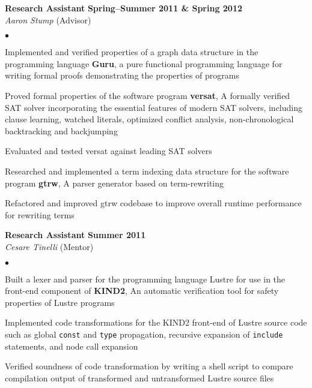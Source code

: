 \documentclass[10pt,letterpaper]{article}
\renewenvironment{itemize}{
  \begin{list}{}{
      \setlength{\leftmargin}{1.5em}
      \setlength{\itemsep}{0.25em}
      \setlength{\parskip}{0pt}
      \setlength{\parsep}{0.25em}
    }
  }{
  \end{list}
}
\newenvironment{bitemize}{
  \begin{list}{$\bullet$}{
      \setlength{\leftmargin}{1.5em}
      \setlength{\itemsep}{0.25em}
      \setlength{\parskip}{0pt}
      \setlength{\parsep}{0.25em}
    }
  }{
  \end{list}
}
\begin{document}
\begin{itemize}
\item \textbf{Research Assistant} \hfill \textbf{Spring--Summer 2011
    \& Spring 2012}\\
  \textit{Aaron Stump} (Advisor)
  \begin{bitemize}
  \item Implemented and verified properties of a graph data structure
    in the programming language \textbf{Guru}, a pure functional
    programming language for writing formal proofs demonstrating the
    properties of programs
  \item Proved formal properties of the software program
    \textbf{versat}, A formally verified SAT solver incorporating the
    essential features of modern SAT solvers, including clause
    learning, watched literals, optimized conflict analysis,
    non-chronological backtracking and backjumping
  \item Evaluated and tested versat against leading SAT solvers
  \item Researched and implemented a term indexing data structure for
    the software program \textbf{gtrw}, A parser generator based on
    term-rewriting
  \item Refactored and improved gtrw codebase to improve overall
    runtime performance for rewriting terms
  \end{bitemize}
\item \textbf{Research Assistant} \hfill \textbf{Summer 2011}\\
  \textit{Cesare Tinelli} (Mentor)
  \begin{bitemize}
  \item Built a lexer and parser for the programming language Lustre
    for use in the front-end component of \textbf{KIND2}, An automatic
    verification tool for safety properties of Lustre programs
  \item Implemented code transformations for the KIND2 front-end of
    Lustre source code such as global \texttt{const} and \texttt{type}
    propagation, recursive expansion of \texttt{include} statements,
    and node call expansion
  \item Verified soundness of code transformation by writing a shell
    script to compare compilation output of transformed and
    untransformed Lustre source files
  \end{bitemize}
\end{itemize}
\end{document}
